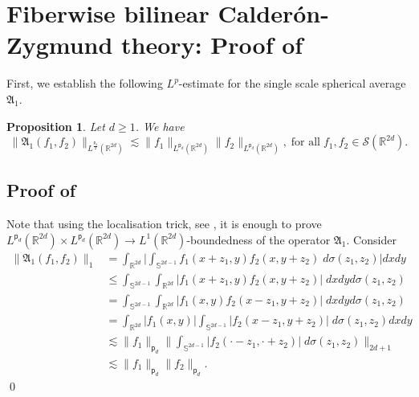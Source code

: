 \documentclass[a4paper,reqno]{amsart}
\newtheorem{proposition}[theorem]{Proposition}
\theoremstyle{definition}
\theoremstyle{remark}
\numberwithin{equation}{section}
\newcommand{\R}{{\mathbb {R}}}
\begin{document}
	\section{Fiberwise bilinear Calder\'{o}n-Zygmund theory: Proof of }\label{fiberwise:sec}
	First, we establish the following $L^p$-estimate for the single scale spherical average $\mathfrak{A}_{1}$. 
	\begin{proposition}\label{singleAvg}
		Let $d\geq1$. We have
		\[\|\mathfrak{A}_{1}(f_1,f_2)\|_{L^\frac{\mathsf{p}_d}{2}(\R^{2d})}\lesssim \|f_1\|_{L^{\mathsf{p}_d}(\R^{2d})}\|f_2\|_{L^{\mathsf{p}_d}(\R^{2d})},\;\text{for all}\;f_1,f_2\in\mathcal{S}(\R^{2d}).\]
	\end{proposition}
	\subsection*{Proof of }
	Note that using the localisation trick, see  \cite[Proposition 4.1]{IPS}, it is enough	to prove $L^{\mathsf{p}_d}(\R^{2d})\times L^{\mathsf{p}_d}(\R^{2d})\to L^1(\R^{2d})$-boundedness of the operator $\mathfrak{A}_1$. Consider 
	\begin{align*}
		\|\mathfrak{A}_1(f_1,f_2)\|_1&=\int_{\R^{2d}}\Big|\int_{\mathbb S^{2d-1}}f_1(x+z_1,y)f_2(x,y+z_2)\;d\sigma(z_1,z_2)\Big|dxdy\\
		&\leq\int_{\mathbb S^{2d-1}}\int_{\R^{2d}}|f_1(x+z_1,y)f_2(x,y+z_2)|\;dxdyd\sigma(z_1,z_2)\\
		&=\int_{\mathbb S^{2d-1}}\int_{\R^{2d}}|f_1(x,y)f_2(x-z_1,y+z_2)|\;dxdyd\sigma(z_1,z_2)\\
		&=\int_{\R^{2d}}|f_1(x,y)|\int_{\mathbb S^{2d-1}}|f_2(x-z_1,y+z_2)|\;d\sigma(z_1,z_2)dxdy\\
		&\lesssim\|f_1\|_{{\mathsf{p}_d}}\Big\|\int_{\mathbb S^{2d-1}}|f_2(\cdot-z_1,\cdot+z_2)|\;d\sigma(z_1,z_2)\Big\|_{2d+1}\\
		&\lesssim\|f_1\|_{{\mathsf{p}_d}}\|f_2\|_{{\mathsf{p}_d}}.
	\end{align*}
	\qed
	
\end{document}
